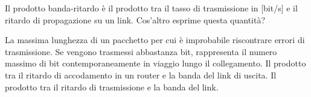 \question
Il prodotto banda-ritardo è il prodotto tra il tasso di trasmissione in [bit/s] e il ritardo di propagazione su un link. Cos'altro esprime questa quantità?

\begin{checkboxes}
	\choice La massima lunghezza di un pacchetto per cui è improbabile riscontrare errori di trasmissione.
	\CorrectChoice Se vengono trasmessi abbastanza bit, rappresenta il numero massimo di bit contemporaneamente in viaggio lungo il collegamento.
	\choice Il prodotto tra il ritardo di accodamento in un router e la banda del link di uscita.
	\choice Il prodotto tra il ritardo di trasmissione e la banda del link.
\end{checkboxes}
